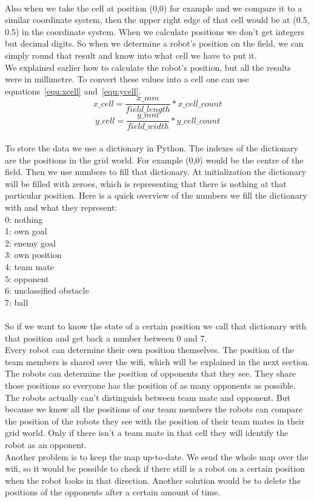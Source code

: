 \documentclass[lnicst,a4paper]{svmultln}
\begin{document}
\\
Also when we take the cell at position (0,0) for example and we compare it to a similar coordinate system, then the upper right edge of that cell would be at (0.5, 0.5) in the coordinate system. When we calculate positions we don't get integers but decimal digits. 
So when we determine a robot's position on the field, we can simply round that result and know into what cell we have to put it.
\\
We explained earlier how to calculate the robot's position, but all the results were in millimetre. To convert these values into a cell one can use equations~\ref{equ:xcell} and~\ref{equ:ycell}.
\begin{equation}
	x\_cell = \frac{x\_mm}{field\_length} * x\_cell\_count
	\label{equ:xcell}
\end{equation}
\begin{equation}
	y\_cell = \frac{y\_mm}{field\_width} * y\_cell\_count
	\label{equ:ycell}
\end{equation}
\\
To store the data we use a dictionary in Python. The indexes of the dictionary are the positions in the grid world. For example (0,0) would be the centre of the field. Then we use numbers to fill that dictionary. At initialization the dictionary will be filled with zeroes, which is representing that there is nothing at that particular position. Here is a quick overview of the numbers we fill the dictionary with and what they represent:\\
0: nothing\\
1: own goal\\
2: enemy goal\\
3: own position\\
4: team mate\\
5: opponent\\
6: unclassified obstacle\\
7: ball\\
\\
So if we want to know the state of a certain position we call that dictionary with that position and get back a number between 0 and 7.
\\
Every robot can determine their own position themselves. The position of the team members is shared over the wifi, which will be explained in the next section. The robots can determine the position of opponents that they see. They share those positions so everyone has the position of as many opponents as possible. The robots actually can't distinguish between team mate and opponent. But because we know all the positions of our team members the robots can compare the position of the robots they see with the position of their team mates in their grid world. Only if there isn't a team mate in that cell they will identify the robot as an opponent. 
\\
Another problem is to keep the map up-to-date. We send the whole map over the wifi, so it would be possible to check if there still is a robot on a certain position when the robot looks in that direction. Another solution would be to delete the positions of the opponents after a certain amount of time.
\end{document}
